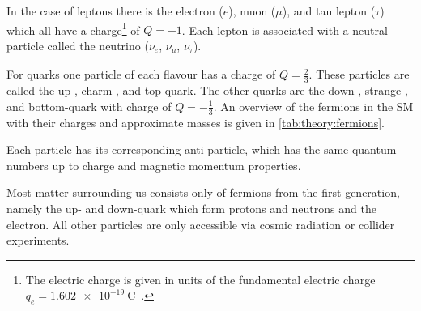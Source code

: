 In the case of leptons there is the electron ($e$), muon ($\mu$), and tau lepton ($\tau$) which all have a
charge\footnote{The electric charge is given in units of the fundamental electric charge $q_e = \SI{1.602e-19}{\coulomb}$~\cite{PDG}.} of $Q = -1$.
Each lepton is associated with a neutral particle called the neutrino ($\nu_e$, $\nu_\mu$, $\nu_\tau$).

For quarks one particle of each flavour has a charge of $Q = \frac{2}{3}$. These particles are called the up-, charm-, and
top-quark.
The other quarks are the down-, strange-, and bottom-quark with charge of $Q = -\frac{1}{3}$.
An overview of the fermions in the SM with their charges and approximate masses is given in \cref{tab:theory:fermions}.

Each particle has its corresponding anti-particle, which has the same quantum numbers up to charge and magnetic momentum properties.

Most matter surrounding us consists only of fermions from the first generation, namely the up- and down-quark which form protons and neutrons and the electron.
All other particles are only accessible via cosmic radiation or collider experiments.

